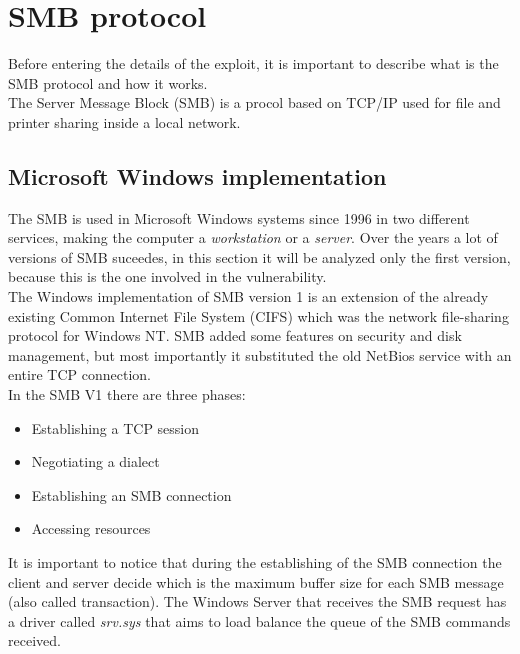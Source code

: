 \section{SMB protocol}
Before entering the details of the exploit, it is important to describe what is the SMB 
protocol and how it works.\\
The Server Message Block (SMB) is a procol based on TCP/IP used for file and printer sharing 
inside a local network.

\subsection{Microsoft Windows implementation}
The SMB is used in Microsoft Windows systems since 1996 in two different services, making the computer a \textit{workstation}
or a \textit{server}.
Over the years a lot of versions of SMB suceedes, in this section it will be analyzed only the first version, because
this is the one involved in the vulnerability.\\
The Windows implementation of SMB version 1 is an extension of the already existing Common Internet File System (CIFS)
which was the network file-sharing protocol for Windows NT.
SMB added some features on security and disk management, but most importantly it substituted the old NetBios service with an entire 
TCP connection.\\
In the SMB V1 there are three phases\cite{microsoft-smb}:
\begin{itemize}
    \item Establishing a TCP session
    \item Negotiating a dialect
    \item Establishing an SMB connection
    \item Accessing resources
\end{itemize}
It is important to notice that during the establishing of the SMB connection the client and server decide which is the maximum
buffer size for each SMB message (also called transaction).
The Windows Server that receives the SMB request has a driver called \textit{srv.sys} that aims to load balance the queue of the SMB commands received.

\clearpage

